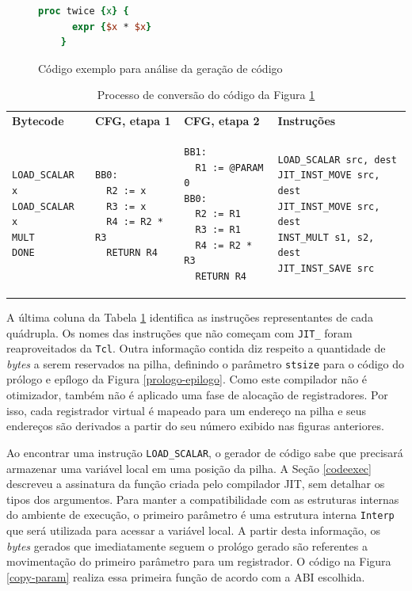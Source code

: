 \begin{figure}[ht!]
  \centering
  \begin{lstlisting}[language=Tcl]
    proc twice {x} {
      expr {$x * $x}
    }
  \end{lstlisting}
  \caption{Código exemplo para análise da geração de código \label{myinc}}
\end{figure}

\begin{table}[ht!]
  \centering
  \caption{Processo de conversão do código da Figura \ref{myinc} \label{tabela-processo}}
  \begin{tabular}{| p{2.8cm} | p{3.3cm} | p{3.4cm} | p{5cm} |}
    \hline
    \bf{Bytecode} & \bf{CFG, etapa 1} & \bf{CFG, etapa 2} & \bf{Instruções}\\
\begin{verbatim}
LOAD_SCALAR x
LOAD_SCALAR x
MULT
DONE
\end{verbatim} &
\begin{verbatim}
BB0:
  R2 := x
  R3 := x
  R4 := R2 * R3
  RETURN R4
\end{verbatim} &
\begin{verbatim}
BB1:
  R1 := @PARAM 0
BB0:
  R2 := R1
  R3 := R1
  R4 := R2 * R3
  RETURN R4
\end{verbatim} &
\begin{verbatim}
LOAD_SCALAR src, dest
JIT_INST_MOVE src, dest
JIT_INST_MOVE src, dest
INST_MULT s1, s2, dest
JIT_INST_SAVE src
\end{verbatim} \\
    \hline
  \end{tabular}
\end{table}

A última coluna da Tabela \ref{tabela-processo} identifica as
instruções representantes de cada quádrupla.
Os nomes das instruções que não
começam com \verb!JIT_! foram reaproveitados da \texttt{Tcl}.
Outra informação contida
diz respeito a quantidade de \textit{bytes} a serem reservados na
pilha, definindo o parâmetro \verb!stsize! para o código do prólogo e
epílogo da Figura \ref{prologo-epilogo}. Como este compilador não é
otimizador, também não é aplicado uma fase de alocação de
registradores. Por isso, cada registrador virtual é mapeado para um
endereço na pilha e seus endereços são derivados a partir do seu
número exibido nas figuras anteriores.

Ao encontrar uma instrução \verb!LOAD_SCALAR!, o gerador de código
sabe que precisará armazenar uma variável local em uma posição da
pilha. A Seção \ref{codeexec} descreveu a assinatura
da função criada pelo compilador JIT, sem detalhar os tipos dos argumentos.
Para manter a compatibilidade com as estruturas internas do ambiente de
execução, o primeiro parâmetro é uma estrutura
interna \verb!Interp! que será utilizada para acessar a
variável local. A partir desta informação, os \textit{bytes} gerados que
imediatamente seguem o prológo gerado são referentes a movimentação do
primeiro parâmetro para um registrador. O código na Figura
\ref{copy-param} realiza essa primeira função de acordo com a ABI escolhida.


